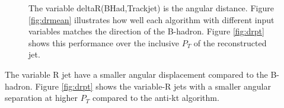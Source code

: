 \begin{figure}[H]
\hspace{-2.5cm}
\caption{The variable deltaR(BHad,Trackjet) is the angular distance. Figure \ref{fig:drmean} illustrates how well each algorithm with different input variables matches the direction of the B-hadron. Figure \ref{fig:drpt} shows this performance over the inclusive $P_T$ of the reconstructed jet.}
\label{fig:drtogether}
\end{figure}

The variable R jet have a smaller angular displacement compared to the B-hadron. Figure \ref{fig:drpt} shows the variable-R jets with a smaller angular separation at higher $P_T$ compared to the anti-kt algorithm. 

